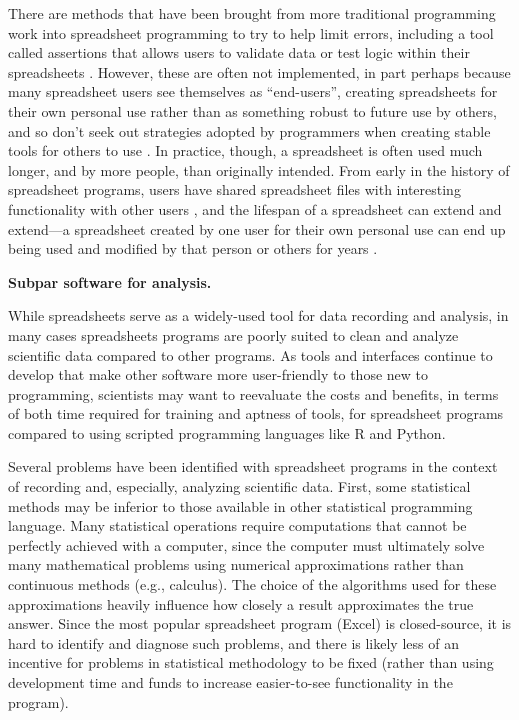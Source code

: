 \documentclass[]{tufte-book}
\begin{document}
There are methods that have been brought from more traditional programming work
into spreadsheet programming to try to help limit errors, including a tool
called assertions that allows users to validate data or test logic within their
spreadsheets \citep{hermans2016spreadsheets}. However, these are often not
implemented, in part perhaps because many spreadsheet users see themselves as
``end-users'', creating spreadsheets for their own personal use rather than as
something robust to future use by others, and so don't seek out strategies
adopted by programmers when creating stable tools for others to use
\citep{hermans2016spreadsheets}. In practice, though, a spreadsheet is often used
much longer, and by more people, than originally intended. From early in the
history of spreadsheet programs, users have shared spreadsheet files with
interesting functionality with other users \citep{levy1984spreadsheet}, and the
lifespan of a spreadsheet can extend and extend---a spreadsheet created by one
user for their own personal use can end up being used and modified by that
person or others for years \citep{hermans2016spreadsheets}.

\textbf{Subpar software for analysis.}

While spreadsheets serve as a widely-used tool for data recording and analysis,
in many cases spreadsheets programs are poorly suited to clean and analyze
scientific data compared to other programs. As tools and interfaces continue to
develop that make other software more user-friendly to those new to programming,
scientists may want to reevaluate the costs and benefits, in terms of both time
required for training and aptness of tools, for spreadsheet programs compared to
using scripted programming languages like R and Python.

Several problems have been identified with spreadsheet programs in the context
of recording and, especially, analyzing scientific data. First, some statistical
methods may be inferior to those available in other statistical programming
language. Many statistical operations require computations that cannot be
perfectly achieved with a computer, since the computer must ultimately solve
many mathematical problems using numerical approximations rather than continuous
methods (e.g., calculus). The choice of the algorithms used for these
approximations heavily influence how closely a result approximates the true
answer. Since the most popular spreadsheet program (Excel) is closed-source, it
is hard to identify and diagnose such problems, and there is likely less of an
incentive for problems in statistical methodology to be fixed (rather than using
development time and funds to increase easier-to-see functionality in the
program).
\end{document}
